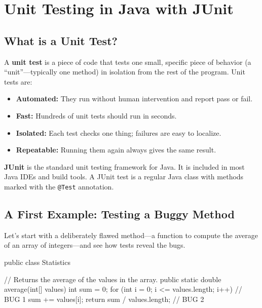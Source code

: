 \documentclass[11pt,letterpaper]{article}
\newcommand{\keyterm}[1]{\textbf{\textcolor{cssecondary}{#1}}}
\begin{document}
\section{Unit Testing in Java with JUnit}

\subsection{What is a Unit Test?}

A \keyterm{unit test} is a piece of code that tests one small, specific piece of behavior (a ``unit''---typically one method) in isolation from the rest of the program. Unit tests are:

\begin{itemize}[itemsep=3pt]
    \item \textbf{Automated:} They run without human intervention and report pass or fail.
    \item \textbf{Fast:} Hundreds of unit tests should run in seconds.
    \item \textbf{Isolated:} Each test checks one thing; failures are easy to localize.
    \item \textbf{Repeatable:} Running them again always gives the same result.
\end{itemize}

\textbf{JUnit} is the standard unit testing framework for Java. It is included in most Java IDEs and build tools. A JUnit test is a regular Java class with methods marked with the \texttt{@Test} annotation.

\subsection{A First Example: Testing a Buggy Method}

Let's start with a deliberately flawed method---a function to compute the average of an array of integers---and see how tests reveal the bugs.

\begin{bugcode}
public class Statistics {

    // Returns the average of the values in the array.
    public static double average(int[] values) {
        int sum = 0;
        for (int i = 0; i <= values.length; i++) {   // BUG 1
            sum += values[i];
        }
        return sum / values.length;                  // BUG 2
    }
}
\end{bugcode}
\end{document}
